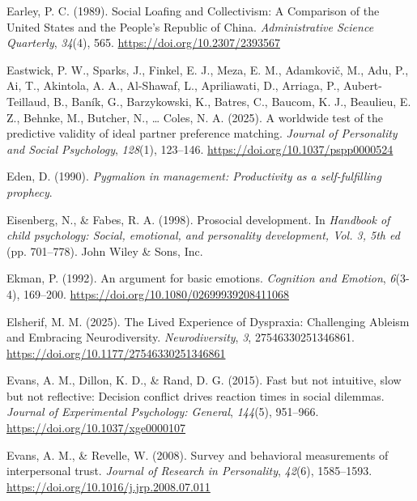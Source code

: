\documentclass[
  letterpaper,
]{book}
\newlength{\cslhangindent}
\newenvironment{CSLReferences}[2] %
 {\begin{list}{}{%
  \setlength{\itemindent}{0pt}
  \setlength{\leftmargin}{0pt}
  \setlength{\parsep}{0pt}
  \ifodd #1
   \setlength{\leftmargin}{\cslhangindent}
   \setlength{\itemindent}{-1\cslhangindent}
  \fi
  \setlength{\itemsep}{#2\baselineskip}}}
 {\end{list}}
\begin{document}
\begin{CSLReferences}{1}{0}
Earley, P. C. (1989). Social {Loafing} and {Collectivism}: {A}
{Comparison} of the {United} {States} and the {People}'s {Republic} of
{China}. \emph{Administrative Science Quarterly}, \emph{34}(4), 565.
\url{https://doi.org/10.2307/2393567}

Eastwick, P. W., Sparks, J., Finkel, E. J., Meza, E. M., Adamkovič, M.,
Adu, P., Ai, T., Akintola, A. A., Al-Shawaf, L., Apriliawati, D.,
Arriaga, P., Aubert-Teillaud, B., Baník, G., Barzykowski, K., Batres,
C., Baucom, K. J., Beaulieu, E. Z., Behnke, M., Butcher, N., \ldots{}
Coles, N. A. (2025). A worldwide test of the predictive validity of
ideal partner preference matching. \emph{Journal of Personality and
Social Psychology}, \emph{128}(1), 123--146.
\url{https://doi.org/10.1037/pspp0000524}

Eden, D. (1990). \emph{Pygmalion in management: Productivity as a
self-fulfilling prophecy}.

Eisenberg, N., \& Fabes, R. A. (1998). Prosocial development. In
\emph{Handbook of child psychology: {Social}, emotional, and personality
development, {Vol}. 3, 5th ed} (pp. 701--778). John Wiley \& Sons, Inc.

Ekman, P. (1992). An argument for basic emotions. \emph{Cognition and
Emotion}, \emph{6}(3-4), 169--200.
\url{https://doi.org/10.1080/02699939208411068}

Elsherif, M. M. (2025). The {Lived} {Experience} of {Dyspraxia}:
{Challenging} {Ableism} and {Embracing} {Neurodiversity}.
\emph{Neurodiversity}, \emph{3}, 27546330251346861.
\url{https://doi.org/10.1177/27546330251346861}

Evans, A. M., Dillon, K. D., \& Rand, D. G. (2015). Fast but not
intuitive, slow but not reflective: {Decision} conflict drives reaction
times in social dilemmas. \emph{Journal of Experimental Psychology:
General}, \emph{144}(5), 951--966.
\url{https://doi.org/10.1037/xge0000107}

Evans, A. M., \& Revelle, W. (2008). Survey and behavioral measurements
of interpersonal trust. \emph{Journal of Research in Personality},
\emph{42}(6), 1585--1593.
\url{https://doi.org/10.1016/j.jrp.2008.07.011}


\end{CSLReferences}
\end{document}
